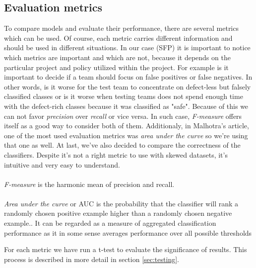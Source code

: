 \subsection{Evaluation metrics}
To compare models and evaluate their performance, there are several metrics which can be used. Of course, each metric carries different information and should be used in different situations. In our case (SFP) it is important to notice which metrics are important and which are not, because it depends on the particular project and policy utilized within the project.
For example is it important to decide if a team should focus on false positives or false negatives. In other words, is it worse for the test team to concentrate on defect-less but falsely classified classes or is it worse when testing teams does not spend enough time with the defect-rich classes because it was classified as "safe". Because of this we can not favor \textit{precision} over \textit{recall} or vice versa. In such case, \textit{F-measure} offers itself as a good way to consider both of them. Additionaly, in Malhotra's article\cite{malhotra2015systematic}, one of the most used evaluation metrics was \textit{area under the curve} so we're using that one as well. At last, we've also decided to compare the correctness of the classifiers. Despite it's not a right metric to use with skewed datasets, it's intuitive and very easy to understand. \\\\
\textit{F-measure} is the harmonic mean of precision and recall.\cite{malhotra2015systematic}\\\\
\textit{Area under the curve} or AUC is the probability that the classifier will rank a randomly chosen positive example higher than a randomly chosen negative example.\cite{japkowicz2011evaluating}. It can be regarded as a measure of aggregated classification performance as it in some sense averages performance over all possible thresholds\cite{dejaeger2013toward}

For each metric we have run a t-test to evaluate the significance of results. This process is described in more detail in section \ref{sec:testing}. 